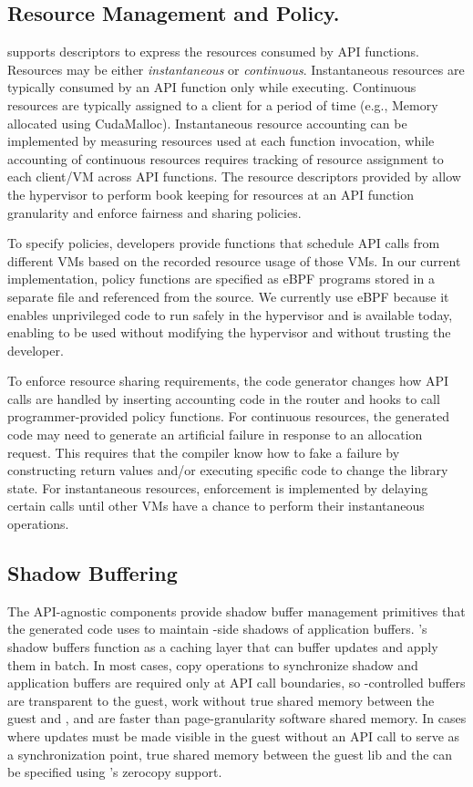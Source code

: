 \subsection{Resource Management and Policy.}
\Lapis supports descriptors to express the resources consumed by API functions.
Resources may be either \emph{instantaneous} or \emph{continuous}.
Instantaneous resources are typically consumed by an API function only while
executing. Continuous resources are typically assigned to a client for a
period of time (e.g., Memory allocated using CudaMalloc). Instantaneous
resource accounting can be implemented by measuring resources used at each
function  invocation, while accounting of continuous resources requires
tracking of resource assignment to each client/VM across API functions. The
resource descriptors provided by \lapis allow the hypervisor to perform book
keeping for resources at an API function granularity and enforce fairness and
sharing policies.

To specify policies, developers provide functions that schedule API calls from
different VMs based on the recorded resource usage of those VMs. In our
current implementation, policy functions are specified as eBPF programs stored
in a separate file and referenced from the \Lapis source. We currently use
eBPF because it enables unprivileged code to run safely in the hypervisor and
is available today, enabling \AvA to be used without modifying the hypervisor
and without trusting the developer.

To enforce resource sharing requirements, the code generator changes how API
calls are handled by inserting accounting code in the router and hooks to call
programmer-provided policy functions. For continuous resources, the generated
code may need to generate an artificial failure in response to an allocation
request. This requires that the compiler know how to fake a failure by
constructing return values and/or executing specific code to change the
library state. For instantaneous resources, enforcement is implemented by
delaying certain calls until other VMs have a chance to perform their
instantaneous operations.

\subsection{Shadow Buffering}

The \AvA API-agnostic components provide shadow buffer management primitives
that the generated code uses to maintain \worker-side shadows of application
buffers. \AvA's shadow buffers function as a caching layer that can buffer
updates and apply them in batch. In most cases, copy operations to synchronize
shadow and application buffers are required only at API call boundaries, so
\AvA-controlled buffers are transparent to the guest, work without true shared
memory between the guest and \worker, and are faster than page-granularity
software shared memory. In cases where updates must be made visible in the
guest without an API call to serve as a synchronization point, true shared
memory between the guest lib and the \worker can be specified using \Lapis's
zerocopy support.

